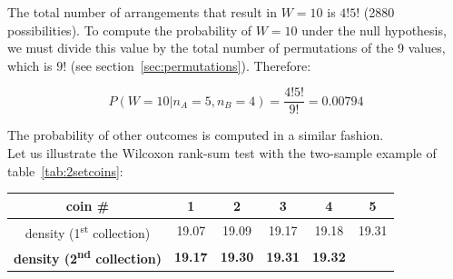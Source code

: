 The total number of arrangements that result in $W=10$ is $4!5!$ (2880
possibilities). To compute the probability of $W=10$ under the null
hypothesis, we must divide this value by the total number of
permutations of the 9 values, which is $9!$ (see
section~\ref{sec:permutations}). Therefore:

\[
P(W=10|n_A=5,n_B=4) = \frac{4!5!}{9!} = 0.00794
\]

The probability of other outcomes is computed in a similar fashion.\\

Let us illustrate the Wilcoxon rank-sum test with the two-sample
example of table~\ref{tab:2setcoins}:

\begin{center}
\begin{tabular}{c|ccccc}
  coin \# & 1 & 2 & 3 & 4 & 5 \\ \hline
  density (1\textsuperscript{st} collection) &
  19.07 & 19.09 & 19.17 & 19.18 & 19.31 \\
  \textbf{density (2\textsuperscript{nd} collection)} &
  \textbf{19.17} & \textbf{19.30} & \textbf{19.31} & \textbf{19.32}
\end{tabular}
\label{tab:mannwhitneycoins}
\end{center}

